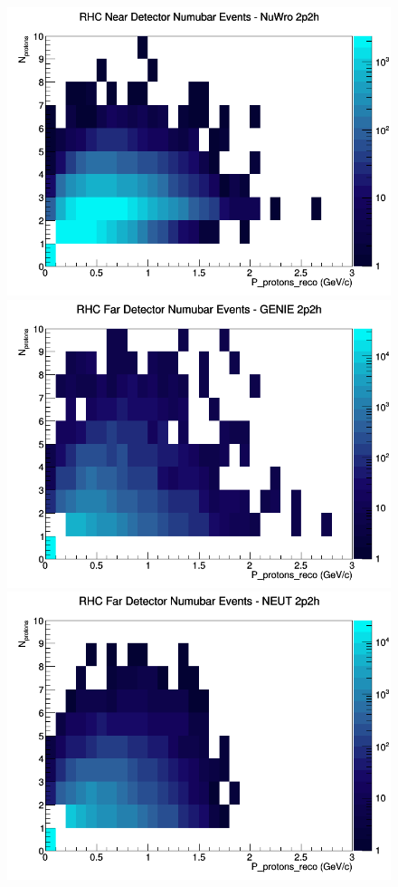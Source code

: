 \begin{figure}[h]
\includegraphics[width=\linewidth]{eff_N_P/GAr/protons/2p2h_RHC_ND_numubar_N_P_NuWro.png}
\endminipage
\newline
{}
\includegraphics[width=\linewidth]{eff_N_P/GAr/protons/2p2h_RHC_FD_numubar_N_P_GENIE.png}
\endminipage
{}
\includegraphics[width=\linewidth]{eff_N_P/GAr/protons/2p2h_RHC_FD_numubar_N_P_NEUT.png}

\end{figure}
